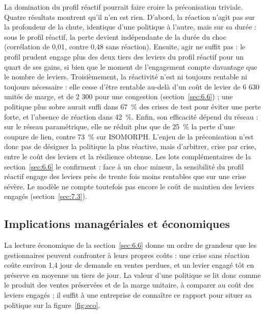 La domination du profil réactif pourrait faire croire la préconisation triviale. Quatre résultats montrent qu'il n'en est rien. D'abord, la réaction n'agit pas sur la profondeur de la chute, identique d'une politique à l'autre, mais sur sa durée : sous le profil réactif, la perte devient indépendante de la durée du choc (corrélation de 0,01, contre 0,48 sans réaction). Ensuite, agir ne suffit pas : le profil prudent engage plus des deux tiers des leviers du profil réactif pour un quart de ses gains, si bien que le moment de l'engagement compte davantage que le nombre de leviers. Troisièmement, la réactivité n'est ni toujours rentable ni toujours nécessaire : elle cesse d'être rentable au-delà d'un coût de levier de 6 630 unités de marge, et de 2 300 pour une congestion (section~\ref{sec:6.6}) ; une politique plus sobre aurait suffi dans 67~\% des crises de test pour éviter une perte forte, et l'absence de réaction dans 42~\%. Enfin, son efficacité dépend du réseau : sur le réseau paramétrique, elle ne réduit plus que de 25~\% la perte d'une coupure de lien, contre 73~\% sur ISOMORPH. L'enjeu de la préconisation n'est donc pas de désigner la politique la plus réactive, mais d'arbitrer, crise par crise, entre le coût des leviers et la résilience obtenue. Les lots complémentaires de la section~\ref{sec:6.6} le confirment : face à un choc mineur, la sensibilité du profil réactif engage des leviers près de trente fois moins rentables que sur une crise sévère. Le modèle ne compte toutefois pas encore le coût de maintien des leviers engagés (section~\ref{sec:7.3}).

\subsection{Implications managériales et économiques}
\label{sec:7.2}

La lecture économique de la section~\ref{sec:6.6} donne un ordre de grandeur que les gestionnaires peuvent confronter à leurs propres coûts : une crise sans réaction coûte environ 1,4 jour de demande en ventes perdues, et un levier engagé tôt en préserve en moyenne un tiers de jour. La valeur d'une politique se lit donc comme le produit des ventes préservées et de la marge unitaire, à comparer au coût des leviers engagés ; il suffit à une entreprise de connaître ce rapport pour situer sa politique sur la figure~\ref{fig:eco}.

